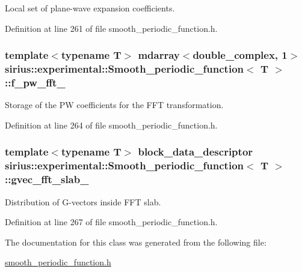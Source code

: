 Local set of plane-\/wave expansion coefficients. 



Definition at line 261 of file smooth\+\_\+periodic\+\_\+function.\+h.

\hypertarget{classsirius_1_1experimental_1_1_smooth__periodic__function_a711aaa88df6147e6642bf2b669e0a5ce}{}
\subsubsection[{f\+\_\+pw\+\_\+fft\+\_\+}]{\setlength{\rightskip}{0pt plus 5cm}template$<$typename T$>$ mdarray$<$double\+\_\+complex, 1$>$ {\bf sirius\+::experimental\+::\+Smooth\+\_\+periodic\+\_\+function}$<$ T $>$\+::f\+\_\+pw\+\_\+fft\+\_\+\hspace{0.3cm}{\ttfamily [protected]}}\label{classsirius_1_1experimental_1_1_smooth__periodic__function_a711aaa88df6147e6642bf2b669e0a5ce}


Storage of the P\+W coefficients for the F\+F\+T transformation. 



Definition at line 264 of file smooth\+\_\+periodic\+\_\+function.\+h.

\hypertarget{classsirius_1_1experimental_1_1_smooth__periodic__function_ac7252a0a850a93fe826ec2bc52dbe769}{}
\subsubsection[{gvec\+\_\+fft\+\_\+slab\+\_\+}]{\setlength{\rightskip}{0pt plus 5cm}template$<$typename T$>$ block\+\_\+data\+\_\+descriptor {\bf sirius\+::experimental\+::\+Smooth\+\_\+periodic\+\_\+function}$<$ T $>$\+::gvec\+\_\+fft\+\_\+slab\+\_\+\hspace{0.3cm}{\ttfamily [protected]}}\label{classsirius_1_1experimental_1_1_smooth__periodic__function_ac7252a0a850a93fe826ec2bc52dbe769}


Distribution of G-\/vectors inside F\+F\+T slab. 



Definition at line 267 of file smooth\+\_\+periodic\+\_\+function.\+h.



The documentation for this class was generated from the following file\+:\begin{DoxyCompactItemize}
\item 
\hyperlink{smooth__periodic__function_8h}{smooth\+\_\+periodic\+\_\+function.\+h}\end{DoxyCompactItemize}
